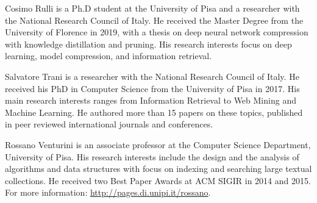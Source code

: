 \begin{IEEEbiography}{Cosimo Rulli}
is a Ph.D student at the University of Pisa and a researcher with the National Research Council of Italy. He received the Master Degree from the University of Florence in 2019, with a thesis on deep neural network compression with knowledge distillation and pruning. His research interests focus on deep learning, model compression, and information retrieval. 
\end{IEEEbiography}

\begin{IEEEbiography}{Salvatore Trani}
is a researcher with the National Research Council of Italy. He received his PhD in Computer Science from the University of Pisa in 2017. His main research interests ranges from Information Retrieval to Web Mining and Machine Learning. He authored more than 15 papers on these topics, published in peer reviewed international journals and  conferences.
\end{IEEEbiography}

\begin{IEEEbiography}{Rossano Venturini}
is an associate professor at the Computer Science Department, University of Pisa. His research interests include the design and the analysis of algorithms and data structures with focus on indexing and searching large textual collections. He received two Best Paper Awards at ACM SIGIR in 2014 and 2015. For more information: \href{http://pages.di.unipi.it/rossano}{http://pages.di.unipi.it/rossano}.
\end{IEEEbiography}


